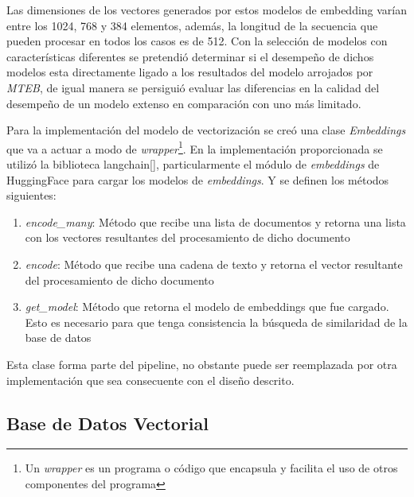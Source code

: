         Las dimensiones de los vectores generados por estos modelos de embedding varían entre los 1024, 768 y 384 elementos, además, la longitud de la secuencia que pueden procesar en todos los casos es de 512. Con la selección de modelos con características diferentes se pretendió determinar si el desempeño de dichos modelos esta directamente ligado a los resultados del modelo arrojados por \emph{MTEB}, de igual manera se persiguió evaluar las diferencias en la calidad del desempeño de un modelo extenso en comparación con uno más limitado.

    Para la implementación del modelo de vectorización se creó una clase \emph{Embeddings} que va a actuar a modo de \emph{wrapper}\footnote{Un \emph{wrapper} es un programa o código que encapsula y facilita el uso de otros componentes del programa}. En la implementación proporcionada se utilizó la biblioteca langchain[\cite{langchain}], particularmente el módulo de \emph{embeddings} de HuggingFace para cargar los modelos de \emph{embeddings}. Y se definen los métodos siguientes:
    \begin{enumerate}
        \item \emph{encode\_many}: Método que recibe una lista de documentos y retorna una lista con los vectores resultantes del procesamiento de dicho documento
        \item \emph{encode}: Método que recibe una cadena de texto y retorna el vector resultante del procesamiento  de dicho documento 
        \item \emph{get\_model}: Método que retorna el modelo de embeddings que fue cargado. Esto es necesario para que tenga consistencia la búsqueda de similaridad de la base de datos
    \end{enumerate}

    Esta clase forma parte del pipeline, no obstante puede ser reemplazada por otra implementación que sea consecuente con el diseño descrito.

    \subsection{Base de Datos Vectorial}
